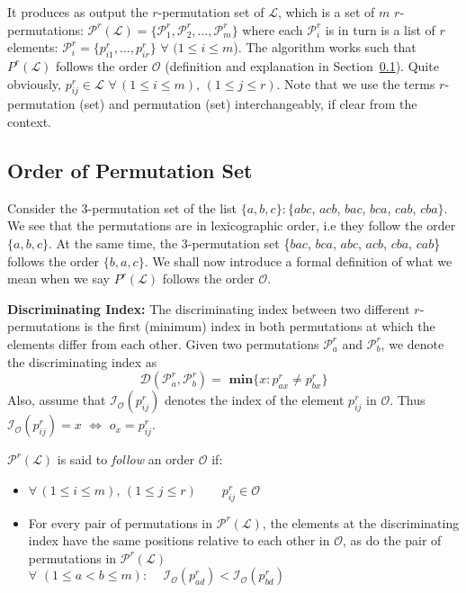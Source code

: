 \documentclass{article}
\begin{document}
It produces as output the $r$-permutation set of $\mathcal{L}$, which is a set of $m$ $r$-permutations: $\mathcal{P}^{r}(\mathcal{L}) = \{\mathcal{P}^r_1, \mathcal{P}^r_2, \ldots, \mathcal{P}^r_m\}$ where each $\mathcal{P}^r_i$ is in turn is a list of $r$ elements: $\mathcal{P}^r_i = \{p^r_{i1}, \ldots, p^r_{ir}\}$ $\forall\,\,(1 \le i \le m$). The algorithm works such that $P^r(\mathcal{L})$ follows the order $\mathcal{O}$ (definition and explanation in Section~\ref{sec:order}). Quite obviously, $p^r_{ij} \in \mathcal{L}\,\,\forall\,(1 \le i \le m),\,(1 \le j \le r)$. Note that we use the terms $r$-permutation ({set}) and permutation ({set}) interchangeably, if clear from the context.

\subsection{Order of Permutation Set}
\label{sec:order}

Consider the $3$-permutation set of the list $\{a,b,c\}: \{abc$, $acb$, $bac$, $bca$, $cab$, $cba\}$. We see that the permutations are in lexicographic order, i.e they follow the order $\{a,b,c\}$. At the same time, the $3$-permutation set \{$bac$, $bca$, $abc$, $acb$, $cba$, $cab$\} follows the order $\{b, a, c\}$. We shall now introduce a formal definition of what we mean when we say  $P^r(\mathcal{L})$ follows the order $\mathcal{O}$.

\noindent \textbf{Discriminating Index:} The discriminating index between two different $r$-permutations is the first (minimum) index in both permutations at which the elements differ from each other. Given two permutations $\mathcal{P}^r_a$ and $\mathcal{P}^r_b$, we denote the discriminating index as 
\[\mathcal{D}(\mathcal{P}^r_a, \mathcal{P}^r_b) = \,\,\textbf{min}\{x: p^r_{ax} \neq p^r_{bx}\}\]
Also, assume that $\mathcal{I}_{\mathcal{O}}(p^r_{ij})$ denotes the index of the element $p^r_{ij}$ in $\mathcal{O}$. Thus $\mathcal{I}_{\mathcal{O}}(p^r_{ij}) = x \,\,\Longleftrightarrow\,\, o_x = p^r_{ij}$.

$\mathcal{P}^r(\mathcal{L})$ is said to \emph{follow} an order $\mathcal{O}$ if:
\begin{itemize}
\item $\forall\,(1 \le i \le m),\,(1 \le j \le r) \qquad p^r_{ij} \in \mathcal{O}$
\item  For every pair of permutations in $\mathcal{P}^r(\mathcal{L})$, the elements at the discriminating index have the same positions relative to each other in $\mathcal{O}$, as do the pair of permutations in $\mathcal{P}^r(\mathcal{L})$ \\
$\forall \,\, (1 \le a < b \le m): \,\,\,\,\,\,\,\mathcal{I}_\mathcal{O}(p^r_{ad}) < \mathcal{I}_\mathcal{O}(p^r_{bd})$
\end{itemize}
\end{document}

